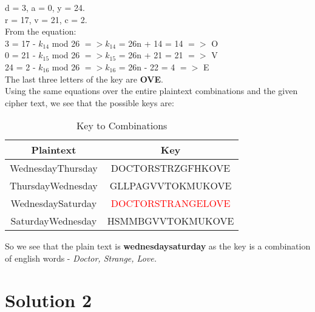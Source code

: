 \documentclass{article}
\newcommand\tab[1][1cm]{\hspace*{#1}}
\begin{document}
        \tab \tab d = 3, a = 0, y = 24.\\
        \tab \tab r = 17, v = 21, c = 2.\\
        From the equation:\\
        \tab \tab 3 = {17 - $k_{14}$} mod 26 $=> k_{14}$ = 26n + 14 = 14 $=>$ O\\
        \tab \tab 0 = {21 - $k_{15}$} mod 26 $=> k_{15}$ = 26n + 21 = 21 $=>$ V\\
        \tab \tab 24 = {2 - $k_{16}$} mod 26 $=> k_{16}$ = 26n - 22 = 4 $=>$ E\\
        The last three letters of the key are \textbf{OVE}.\\
        Using the same equations over the entire plaintext combinations and the given cipher text, we see that the possible keys are:
        \begin{table}[H]
            \centering
            \caption{Key to Combinations}
            \label{tab:table2}

            \begin{tabular}{|c|c|}

                \toprule
                Plaintext & Key\\
                \midrule
                WednesdayThursday & DOCTORSTRZGFHKOVE\\
                \hline
                ThursdayWednesday & GLLPAGVVTOKMUKOVE\\
                \hline
                WednesdaySaturday & \textcolor{red}{DOCTORSTRANGELOVE}\\
                \hline
                SaturdayWednesday & HSMMBGVVTOKMUKOVE\\
                \hline
            \end{tabular}
        \end{table}
        
        So we see that the plain text is \textbf{wednesdaysaturday} as the key is a combination of english words - \textit{Doctor, Strange, Love.}
    \section*{Solution 2}
\end{document}
